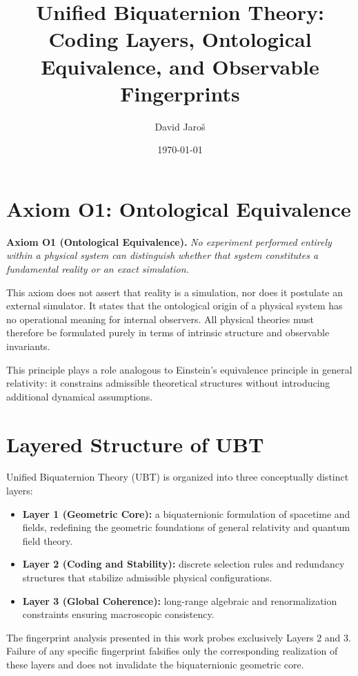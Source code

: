 \documentclass[11pt]{article}
\title{Unified Biquaternion Theory:\\
Coding Layers, Ontological Equivalence, and Observable Fingerprints}
\author{David Jaro\v{s}}
\date{\today}
\begin{document}
\maketitle

\section*{Axiom O1: Ontological Equivalence}

\textbf{Axiom O1 (Ontological Equivalence).}
\emph{No experiment performed entirely within a physical system can
distinguish whether that system constitutes a fundamental reality
or an exact simulation.}

This axiom does not assert that reality is a simulation, nor does it
postulate an external simulator. It states that the ontological origin
of a physical system has no operational meaning for internal observers.
All physical theories must therefore be formulated purely in terms of
intrinsic structure and observable invariants.

This principle plays a role analogous to Einstein's equivalence
principle in general relativity: it constrains admissible theoretical
structures without introducing additional dynamical assumptions.

\section{Layered Structure of UBT}

Unified Biquaternion Theory (UBT) is organized into three conceptually
distinct layers:

\begin{itemize}
\item \textbf{Layer 1 (Geometric Core):} a biquaternionic formulation of
spacetime and fields, redefining the geometric foundations of general
relativity and quantum field theory.
\item \textbf{Layer 2 (Coding and Stability):} discrete selection rules
and redundancy structures that stabilize admissible physical
configurations.
\item \textbf{Layer 3 (Global Coherence):} long-range algebraic and
renormalization constraints ensuring macroscopic consistency.
\end{itemize}

The fingerprint analysis presented in this work probes exclusively
Layers 2 and 3. Failure of any specific fingerprint falsifies only the
corresponding realization of these layers and does not invalidate the
biquaternionic geometric core.
\end{document}
